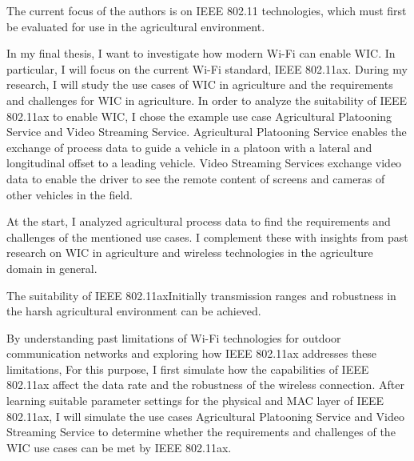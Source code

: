 The current focus of the authors is on IEEE 802.11 technologies, which must first be evaluated for use in the agricultural environment.

In my final thesis, I want to investigate how modern Wi-Fi can enable \ac{WIC}. In particular, I will focus on the current Wi-Fi standard, IEEE 802.11ax.
During my research, I will study the use cases of \ac{WIC} in agriculture and the requirements and challenges for \ac{WIC} in agriculture.
In order to analyze the suitability of IEEE 802.11ax  to enable \ac{WIC},  I chose the example use case Agricultural Platooning Service and Video Streaming Service. Agricultural Platooning Service enables the exchange of process data
to guide a vehicle in a platoon with a lateral and longitudinal offset to a leading vehicle. Video Streaming Services exchange video data to enable the driver to see the
remote content of screens and cameras of other vehicles in the field.

At the start, I analyzed agricultural process data to find the requirements and challenges of the mentioned use cases.
I complement these with insights from past research on \ac{WIC} in agriculture and wireless technologies
in the agriculture domain in general.

The suitability of IEEE 802.11axInitially
transmission ranges and robustness in the harsh agricultural environment can be achieved.

By understanding past limitations of Wi-Fi technologies for outdoor communication networks
and exploring how IEEE 802.11ax addresses these limitations,
For this purpose, I first simulate how the capabilities of IEEE 802.11ax affect the data rate and the robustness of the wireless connection.
After learning suitable parameter settings for the physical and MAC layer of IEEE 802.11ax, I will simulate the use cases
Agricultural Platooning Service and Video Streaming Service to determine whether the requirements and challenges of the \ac{WIC} use cases
can be met by IEEE 802.11ax.


